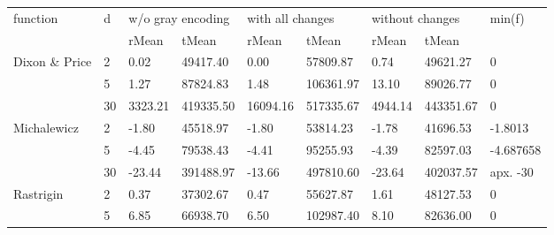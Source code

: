 \documentclass{article}
\begin{document}
\begin{table}[!h]
    \setlength\tabcolsep{3pt}
    {\scriptsize
    \begin{tabular}{ll|lllllll}
    \multirow{2}{*}{function}       & \multirow{2}{*}{d} & \multicolumn{2}{l}{w/o gray encoding} & \multicolumn{2}{l}{with all changes} & \multicolumn{2}{l}{without changes} & \multirow{2}{*}{min(f)} \\
                                    &                    & rMean            & tMean              & rMean            & tMean             & rMean           & tMean             &                         \\ \hline
    \multirow{3}{*}{Dixon \& Price} & 2                  & 0.02             & 49417.40           & 0.00             & 57809.87          & 0.74            & 49621.27          & 0                       \\
                                    & 5                  & 1.27             & 87824.83           & 1.48             & 106361.97         & 13.10           & 89026.77          & 0                       \\
                                    & 30                 & 3323.21          & 419335.50          & 16094.16         & 517335.67         & 4944.14         & 443351.67         & 0                       \\
    \multirow{3}{*}{Michalewicz}    & 2                  & -1.80            & 45518.97           & -1.80            & 53814.23          & -1.78           & 41696.53          & -1.8013                 \\
                                    & 5                  & -4.45            & 79538.43           & -4.41            & 95255.93          & -4.39           & 82597.03          & -4.687658               \\
                                    & 30                 & -23.44           & 391488.97          & -13.66           & 497810.60         & -23.64          & 402037.57         & apx. -30                \\
    \multirow{3}{*}{Rastrigin}      & 2                  & 0.37             & 37302.67           & 0.47             & 55627.87          & 1.61            & 48127.53          & 0                       \\
                                    & 5                  & 6.85             & 66938.70           & 6.50             & 102987.40         & 8.10            & 82636.00          & 0                       \\

\end{tabular}}
\end{table}
\end{document}
